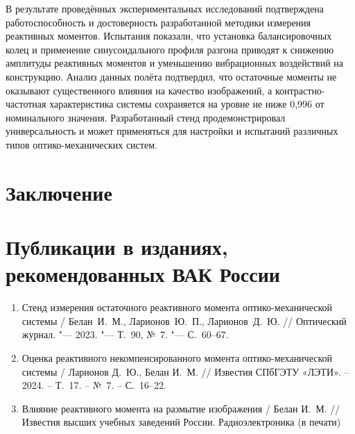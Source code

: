 В результате проведённых экспериментальных исследований подтверждена работоспособность и достоверность разработанной методики измерения реактивных моментов.
Испытания показали, что установка балансировочных колец и применение синусоидального профиля разгона приводят к снижению амплитуды реактивных моментов и уменьшению вибрационных воздействий на конструкцию.
Анализ данных полёта подтвердил, что остаточные моменты не оказывают существенного влияния на качество изображений, а контрастно-частотная характеристика системы сохраняется на уровне не ниже 0,996 от номинального значения.
Разработанный стенд продемонстрировал универсальность и может применяться для настройки и испытаний различных типов оптико-механических систем.







\FloatBarrier
{}                                  %
\section*{Заключение}



\section*{Публикации в изданиях, рекомендованных ВАК России}
\begin{enumerate}
\item  Стенд измерения остаточного реактивного момента оптико-механической системы / Белан~И.~М., Ларионов~Ю.~П., Ларионов~Д.~Ю.  // Оптический журнал. "--- 2023. "--- Т.~90, №~7. "--- С.~60--67.

\item Оценка реактивного некомпенсированного момента оптико-механической системы / Ларионов Д.~Ю., Белан И.~М. // Известия СПбГЭТУ «ЛЭТИ». – 2024. – Т.~17. – №~7. – С.~16--22.

\item Влияние реактивного момента на размытие изображения / Белан И.~М. //  Известия высших учебных заведений России. Радиоэлектроника (в печати)




\end{enumerate}

